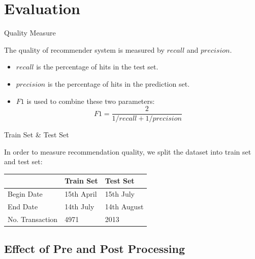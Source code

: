 \documentclass{beamer}
\begin{document}
\section{Evaluation}


\begin{frame}{Quality Measure}

The quality of recommender system is measured by $recall$ and $precision$.

\begin{itemize}
\item $recall$ is the percentage of hits in the test set.
\item $precision$ is the percentage of hits in the prediction set.
\item $F1$ is used to combine these two parameters:
    \begin{equation}
    F1 = \frac{2}{1/recall + 1/precision}
    \end{equation}
\end{itemize}

\end{frame}



\begin{frame}{Train Set \& Test Set}

In order to measure recommendation quality, we split the dataset into train set and test set:

\begin{center}
  \begin{tabular}{ | l | l | l | }
    \hline
    ~           & Train Set & Test Set \\ \hline
    Begin Date  & 15th April    & 15th July  \\ \hline
    End Date    & 14th July     & 14th August  \\ \hline
    No. Transaction    & 4971   & 2013    \\ \hline
  \end{tabular}
\end{center}

\end{frame}



\subsection{Effect of Pre and Post Processing}
\end{document}
